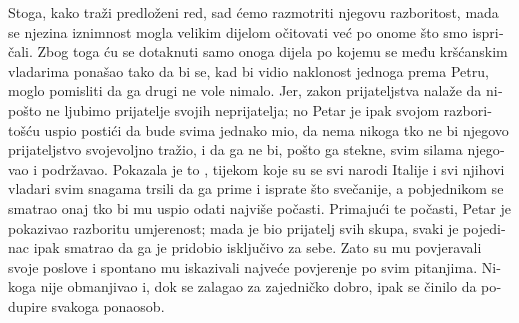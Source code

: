 \documentclass[a5paper,twoside]{article}
\begin{document}
\begin{pages}
\begin{Rightside}
\begin{croatian}
Stoga, kako traži predloženi red, sad ćemo razmotriti njegovu razboritost, mada se njezina iznimnost mogla velikim dijelom očitovati već po onome što smo ispričali.  Zbog toga ću se dotaknuti samo onoga dijela po kojemu se među kršćanskim vladarima ponašao tako da bi se, kad bi vidio naklonost jednoga prema Petru, moglo pomisliti da ga drugi ne vole nimalo.  Jer, zakon prijateljstva nalaže da nipošto ne ljubimo prijatelje svojih neprijatelja; no Petar je ipak svojom razboritošću uspio postići da bude svima jednako mio, da nema nikoga tko ne bi njegovo prijateljstvo svojevoljno tražio, i da ga ne bi, pošto ga stekne, svim silama njegovao i podržavao.  Pokazala je to , tijekom koje su se svi narodi Italije i svi njihovi vladari svim snagama trsili da ga prime i isprate što svečanije, a pobjednikom se smatrao onaj tko bi mu uspio odati najviše počasti.  Primajući te počasti, Petar je pokazivao razboritu umjerenost; mada je bio prijatelj svih skupa, svaki je pojedinac ipak smatrao da ga je pridobio isključivo za sebe.  Zato su mu povjeravali svoje poslove i spontano mu iskazivali najveće povjerenje po svim pitanjima.  Nikoga nije obmanjivao i, dok se zalagao za zajedničko dobro, ipak se činilo da podupire svakoga ponaosob. 


\end{croatian}
\end{Rightside}
\end{pages}
\end{document}

